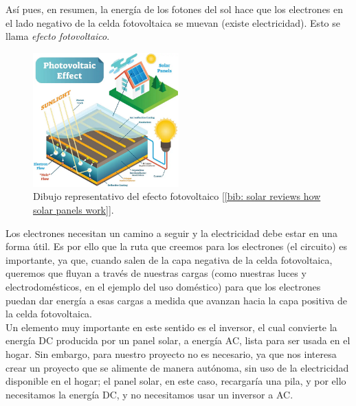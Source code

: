 \documentclass[12pt]{article}
\begin{document}
	\noindent Así pues, en resumen, la energía de los fotones del sol hace que los electrones en el lado negativo de la celda fotovoltaica se muevan (existe electricidad). Esto se llama \textit{efecto fotovoltaico}.\\
	
	\begin{figure}[h]
		\begin{center}
			\includegraphics[width=0.5\textwidth]{img/photovoltaic_effect.png}
			\caption{Dibujo representativo del efecto fotovoltaico [\ref{bib: solar reviews how solar panels work}].}
			\label{fig: efecto fotovoltaico}
		\end{center}
	\end{figure}
	
	\pagebreak
	
	\noindent Los electrones necesitan un camino a seguir y la electricidad debe estar en una forma útil. Es por ello que la ruta que creemos para los electrones (el circuito) es importante, ya que, cuando salen de la capa negativa de la celda fotovoltaica, queremos que fluyan a través de nuestras cargas (como nuestras luces y electrodomésticos, en el ejemplo del uso doméstico) para que los electrones puedan dar energía a esas cargas a medida que avanzan hacia la capa positiva de la celda fotovoltaica. \\
	
	
	\noindent Un elemento muy importante en este sentido es el inversor, el cual convierte la energía DC producida por un panel solar, a energía AC, lista para ser usada en el hogar. Sin embargo, para nuestro proyecto no es necesario, ya que nos interesa crear un proyecto que se alimente de manera autónoma, sin uso de la electricidad disponible en el hogar; el panel solar, en este caso, recargaría una pila, y por ello necesitamos la energía DC, y no necesitamos usar un inversor a AC. \\ 
	
\end{document}
